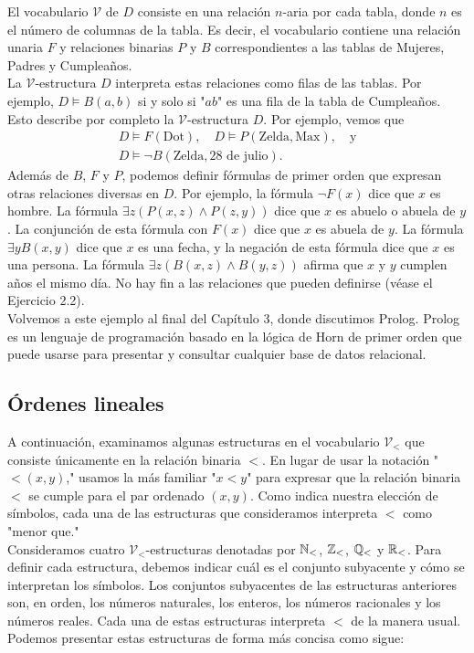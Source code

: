\message{ !name(main.tex)}\documentclass[12pt,a4paper]{book}
\newcommand{\comillas}[1]{"#1"}
\newcommand{\VV}{\mathcal{V}}
\begin{document}
    El vocabulario $\VV$ de $D$ consiste en una relación $n$-aria por cada tabla, donde $n$ es el número de columnas de la
    tabla. Es decir, el vocabulario contiene una relación unaria $F$ y relaciones binarias $P$ y $B$ correspondientes a las
    tablas de Mujeres, Padres y Cumpleaños.\\
    La $\VV$-estructura $D$ interpreta estas relaciones como filas de las tablas. Por ejemplo, $D\models B(a,b)$ si y solo
    si \comillas{$ab$} es una fila de la tabla de Cumpleaños. Esto describe por completo la $\VV$-estructura $D$. Por
    ejemplo, vemos que
    \begin{gather*}
        D\models F(\text{Dot}),\quad D\models P(\text{Zelda},\text{Max}),\quad\text{y}\\
        D\models\neg B(\text{Zelda},\text{28 de julio}).
    \end{gather*}
    Además de $B$, $F$ y $P$, podemos definir fórmulas de primer orden que expresan otras relaciones diversas en $D$. Por
    ejemplo, la fórmula $\neg F(x)$ dice que $x$ es hombre. La fórmula $\exists z(P(x,z)\wedge P(z,y))$ dice que $x$ es
    abuelo o abuela de $y$. La conjunción de esta fórmula con $F(x)$ dice que $x$ es abuela de $y$. La fórmula
    $\exists yB(x,y)$ dice que $x$ es una fecha, y la negación de esta fórmula dice que $x$ es una persona. La fórmula
    $\exists z(B(x,z)\wedge B(y,z))$ afirma que $x$ y $y$ cumplen años el mismo día. No hay fin a las relaciones que pueden
    definirse (véase el Ejercicio 2.2).\\
    Volvemos a este ejemplo al final del Capítulo 3, donde discutimos Prolog. Prolog es un lenguaje de programación basado
    en la lógica de Horn de primer orden que puede usarse para presentar y consultar cualquier base de datos relacional.

    \subsection{Órdenes lineales}

    A continuación, examinamos algunas estructuras en el vocabulario $\VV_{<}$ que consiste únicamente en la relación
    binaria $<$. En lugar de usar la notación \comillas{$<(x,y)$,} usamos la más familiar \comillas{$x<y$} para expresar
    que la relación binaria $<$ se cumple para el par ordenado $(x,y)$. Como indica nuestra elección de símbolos, cada una
    de las estructuras que consideramos interpreta $<$ como \comillas{menor que.}\\
    Consideramos cuatro $\VV_{<}$-estructuras denotadas por $\mathbb{N}_{<}$, $\mathbb{Z}_{<}$, $\mathbb{Q}_{<}$ y $\mathbb{R}_{<}$. Para definir cada
    estructura, debemos indicar cuál es el conjunto subyacente y cómo se interpretan los símbolos. Los conjuntos
    subyacentes de las estructuras anteriores son, en orden, los números naturales, los enteros, los números racionales y
    los números reales. Cada una de estas estructuras interpreta $<$ de la manera usual. Podemos presentar estas
    estructuras de forma más concisa como sigue:
\end{document}
